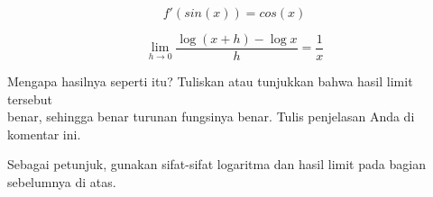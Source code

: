 \documentclass{article}
\begin{document}
\begin{eulernotebook}
\begin{eulercomment}
\begin{eulercomment}
\begin{eulercomment}
\begin{eulercomment}
\begin{eulercomment}
\begin{eulercomment}
\begin{eulercomment}
\end{eulercomment}
\begin{eulerformula}
\[
f'(sin(x)) = cos(x)
\]
\end{eulerformula}
\eulersubheading{}
\begin{eulerformula}
\[
\lim_{h\rightarrow 0}{\frac{\log \left(x+h\right)-\log x}{h}}=  \frac{1}{x}
\]
\end{eulerformula}
\begin{eulercomment}
Mengapa hasilnya seperti itu? Tuliskan atau tunjukkan bahwa hasil
limit tersebut\\
benar, sehingga benar turunan fungsinya benar.  Tulis penjelasan Anda
di komentar ini.

Sebagai petunjuk, gunakan sifat-sifat logaritma dan hasil limit pada
bagian sebelumnya di atas.


\end{eulercomment}
\end{eulercomment}
\end{eulercomment}
\end{eulercomment}
\end{eulercomment}
\end{eulercomment}
\end{eulercomment}
\end{eulernotebook}
\end{document}
